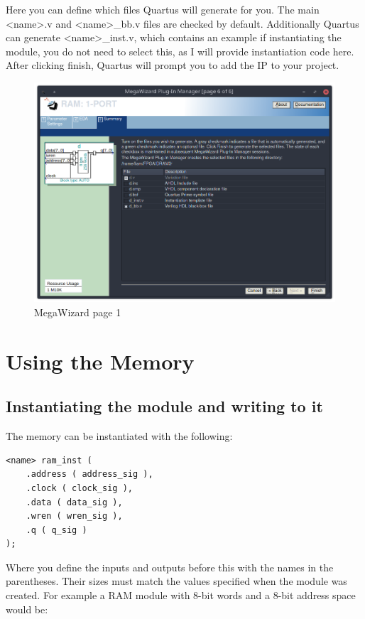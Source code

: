 \documentclass[letter,12pt]{article}
\begin{document}
Here you can define which files Quartus will generate for you. The main \textless name\textgreater.v and \textless name\textgreater\_bb.v files are checked by default. Additionally Quartus can generate \textless name\textgreater\_inst.v, which contains an example if instantiating the module, you do not need to select this, as I will provide instantiation code here.
After clicking finish, Quartus will prompt you to add the IP to your project.
\begin{figure}[H]
  \centering
  \includegraphics[width=.83\linewidth]{pics/Mega6.png}
  \caption{MegaWizard page 1}
\end{figure}


\section{Using the Memory}
\subsection{Instantiating the module and writing to it}
The memory can be instantiated with the following:
\begin{verbatim}
<name> ram_inst (
    .address ( address_sig ),
    .clock ( clock_sig ),
    .data ( data_sig ),
    .wren ( wren_sig ),
    .q ( q_sig )
);
\end{verbatim}

Where you define the inputs and outputs before this with the names in the parentheses. Their sizes must match the values specified when the module was created. For example a RAM module with 8-bit words and a 8-bit address space would be:
\end{document}
